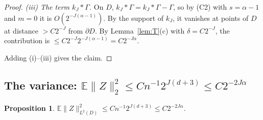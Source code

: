 \documentclass[11pt]{article}
\newtheorem{proposition}[theorem]{Proposition}
\theoremstyle{definition}
\theoremstyle{remark}
\newcommand{\E}{\mathbb E}
\begin{document}
\begin{proof}
\emph{(iii) The term $k_J*\Gamma$.} On $D$, $k_J*\Gamma=k_J*\Gamma-\Gamma$, so by (C2) with $s=\alpha-1$ and $m=0$ it is $O(2^{-J(\alpha-1)})$. By the support of $k_J$, it vanishes at points of $D$ at distance $>C2^{-J}$ from $\partial D$. By Lemma~\ref{lem:T}(c) with $\delta=C2^{-J}$, the contribution is $\le C2^{-J}2^{-J(\alpha-1)}=C2^{-J\alpha}$.

Adding (i)--(iii) gives the claim.
\end{proof}

\subsection{\texorpdfstring{The variance: $\E\|Z\|^2_2\le Cn^{-1}2^{J(d+3)}\le C2^{-2J\alpha}$}{The variance}}

\begin{proposition}\label{prop:var}
$\E\|Z\|^2_{L^2(D)}\le Cn^{-1}2^{J(d+3)}\le C2^{-2J\alpha}$.
\end{proposition}
\end{document}
